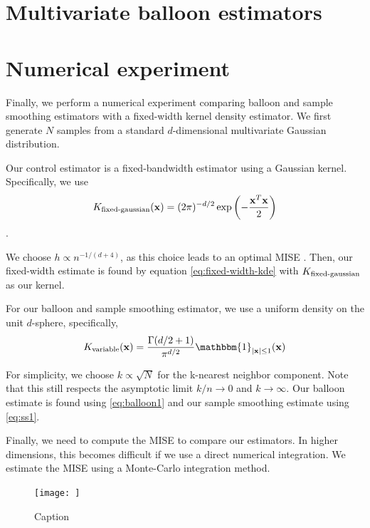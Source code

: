 \documentclass{article}
\begin{document}
\section{Multivariate balloon estimators}

\section{Numerical experiment}

Finally, we perform a numerical experiment comparing balloon and sample smoothing estimators with a fixed-width kernel density estimator. We first generate $N$ samples from a standard $d$-dimensional multivariate Gaussian distribution.

Our control estimator is a fixed-bandwidth estimator using a Gaussian kernel. Specifically, we use
\begin{equation}
    K_\textup{fixed-gaussian}(\mathbf{x}) = (2\pi)^{-d/2}\exp\left(-\frac{\mathbf{x}^T\mathbf{x}}{2}\right)
\end{equation}.

We choose $h \propto n^{-1/(d+4)}$, as this choice leads to an optimal MISE \cite{jnw}. Then, our fixed-width estimate is found by equation \eqref{eq:fixed-width-kde} with $K_\textup{fixed-gaussian}$ as our kernel.

For our balloon and sample smoothing estimator, we use a uniform density on the unit $d$-sphere, specifically,
\begin{equation}
    K_{\textup{variable}}(\mathbf{x}) = \frac{\Gamma(d/2+1)}{\pi^{d/2}}\mathbbm{1}_{\vert\mathbf{x}\vert\leq1}(\mathbf{x})
\end{equation}

For simplicity, we choose $k \propto \sqrt{N}$ for the k-nearest neighbor component. Note that this still respects the asymptotic limit $k/n \rightarrow 0$ and $k\rightarrow \infty$. Our balloon estimate is found using \eqref{eq:balloon1} and our sample smoothing estimate using \eqref{eq:ss1}.

Finally, we need to compute the MISE to compare our estimators. In higher dimensions, this becomes difficult if we use a direct numerical integration. We estimate the MISE using a Monte-Carlo integration method. 

\begin{figure}
    \centering
    \texttt{[image: ]}
    \caption{Caption}
    \label{fig:enter-label}
\end{figure}
\end{document}
